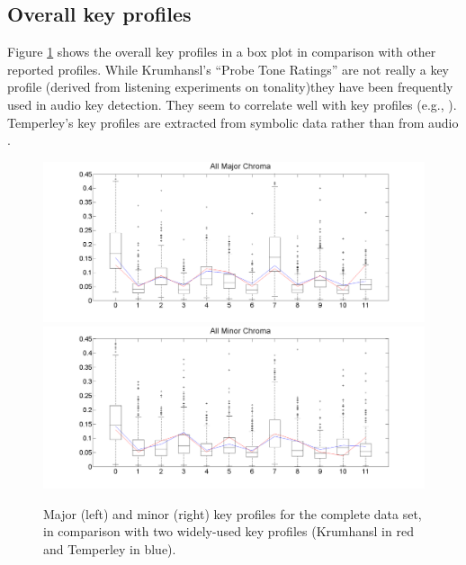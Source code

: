 \documentclass{article}
\begin{document}
\subsection{Overall key profiles}
Figure \ref{fig:OverallKeyProfiles} shows the overall key profiles in a box plot in comparison with other reported profiles. 
While Krumhansl's ``Probe Tone Ratings'' \cite{krumhansl_cognitive_1990} are not really a key profile (derived from listening experiments on tonality)they have been frequently used in audio key detection. They seem to correlate well with key profiles (e.g., \cite{izmirli_template_2005}). 
Temperley's key profiles are extracted from symbolic data  rather than from audio \cite{temperley_bayesian_2004,temperley_pitch-class_2008}.
\begin{figure}[tb]
    \includegraphics[scale=.2]{graph/allMajChroma+Krum+Temp}
    \includegraphics[scale=.2]{graph/allMinChroma+Krum+Temp}
	\caption{Major (left) and minor (right) key profiles for the complete data set, in comparison with two widely-used key profiles (Krumhansl in red and Temperley in blue).}
	\label{fig:OverallKeyProfiles}
\end{figure}
\end{document}
